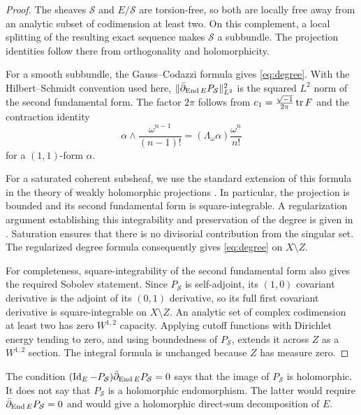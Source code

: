 \begin{proof}
The sheaves $\mathcal S$ and $E/\mathcal S$ are torsion-free, so both
are locally free away from an analytic subset of codimension at least
two. On this complement, a local splitting of the resulting exact
sequence makes $\mathcal S$ a subbundle. The projection identities follow
there from orthogonality and holomorphicity.

For a smooth subbundle, the Gauss--Codazzi formula gives
\eqref{eq:degree}. With the Hilbert--Schmidt convention used here,
$\lVert\bar\partial_{\operatorname{End} E}P_{\mathcal S}\rVert_{L^2}^2$ is the squared $L^2$ norm of
the second fundamental form. The factor $2\pi$ follows from
$c_1=\frac{\sqrt{-1}}{2\pi}\operatorname{tr} F$ and the contraction identity
\[
 \alpha\wedge\frac{\omega^{n-1}}{(n-1)!}
 =(\Lambda_\omega\alpha)\frac{\omega^n}{n!}
\]
for a $(1,1)$-form $\alpha$.

For a saturated coherent subsheaf, we use the standard extension of this
formula in the theory of weakly holomorphic projections
\cite{UhlenbeckYau1986,Kobayashi1987}. In particular, the projection is
bounded and its second fundamental form is square-integrable. A
regularization argument establishing this integrability and preservation
of the degree is given in \cite[Sections~2--3]{Jacob2014}. Saturation
ensures that there is no divisorial contribution from the singular set.
The regularized degree formula consequently gives
\eqref{eq:degree} on $X\setminus Z$.

For completeness, square-integrability of the second fundamental form
also gives the required Sobolev statement. Since $P_{\mathcal S}$ is self-adjoint,
its $(1,0)$ covariant derivative is the adjoint of its $(0,1)$ derivative,
so its full first covariant derivative is square-integrable on
$X\setminus Z$. An analytic set of complex codimension at least two has
zero $W^{1,2}$ capacity. Applying cutoff functions with Dirichlet energy
tending to zero, and using boundedness of $P_{\mathcal S}$, extends it across $Z$
as a $W^{1,2}$ section. The integral formula is unchanged because $Z$
has measure zero.
\end{proof}

\begin{remark}\label{rem:weak}
The condition $(\operatorname{Id}_E-P_{\mathcal S})\bar\partial_{\operatorname{End} E}P_{\mathcal S}=0$ says that the image of
$P_{\mathcal S}$ is holomorphic. It does not say that $P_{\mathcal S}$ is a holomorphic
endomorphism. The latter would require $\bar\partial_{\operatorname{End} E}P_{\mathcal S}=0$ and would
give a holomorphic direct-sum decomposition of $E$.
\end{remark}

